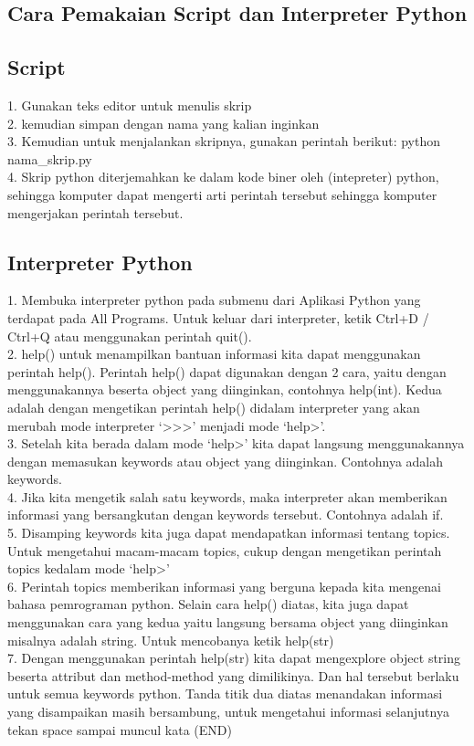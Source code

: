 \subsection{Cara Pemakaian Script dan Interpreter Python}
\subsection{Script}
1. Gunakan teks editor untuk menulis skrip\\
2. kemudian simpan dengan nama yang kalian inginkan\\
3. Kemudian untuk menjalankan skripnya, gunakan perintah berikut: python nama_skrip.py\\
4. Skrip python diterjemahkan ke dalam kode biner oleh (intepreter) python, sehingga komputer dapat mengerti arti perintah tersebut sehingga komputer mengerjakan perintah tersebut.\\
\subsection{Interpreter Python}
1. Membuka interpreter python pada submenu dari Aplikasi Python yang terdapat pada All Programs. Untuk keluar dari interpreter, ketik Ctrl+D / Ctrl+Q atau menggunakan perintah quit().\\
2. help() untuk menampilkan bantuan informasi kita dapat menggunakan perintah help(). Perintah help() dapat digunakan dengan 2 cara, yaitu dengan menggunakannya beserta object yang diinginkan, contohnya help(int). Kedua adalah dengan mengetikan perintah help() didalam interpreter yang akan merubah mode interpreter ‘>>>’ menjadi mode ‘help>’.\\
3. Setelah kita berada dalam mode ‘help>’ kita dapat langsung menggunakannya dengan memasukan keywords atau object yang diinginkan. Contohnya adalah keywords.\\
4. Jika kita mengetik salah satu keywords, maka interpreter akan memberikan informasi yang bersangkutan dengan keywords tersebut. Contohnya adalah if.\\
5. Disamping keywords kita juga dapat mendapatkan informasi tentang topics. Untuk mengetahui macam-macam topics, cukup dengan mengetikan perintah topics kedalam mode ‘help>’\\
6. Perintah topics memberikan informasi yang berguna kepada kita mengenai bahasa pemrograman python. Selain cara help() diatas, kita juga dapat menggunakan cara yang kedua yaitu langsung bersama object yang diinginkan misalnya adalah string. Untuk mencobanya ketik help(str)\\
7. Dengan menggunakan perintah help(str) kita dapat mengexplore object string beserta attribut dan method-method yang dimilikinya. Dan hal tersebut berlaku untuk semua keywords python. Tanda titik dua diatas menandakan informasi yang disampaikan masih bersambung, untuk mengetahui informasi selanjutnya tekan space sampai muncul kata (END)\\

